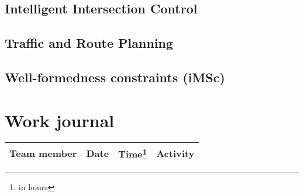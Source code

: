 \documentclass[a4paper]{article}
\begin{document}
\subsection{Intelligent Intersection Control}


\subsection{Traffic and Route Planning}


\subsection{Well-formedness constraints (iMSc)}



\section{Work journal}

\begin{tabularx}{\textwidth}{l l l X}
	\toprule
	Team member & Date & Time\footnote{in hours} & Activity \\ \midrule
	\bottomrule
\end{tabularx}

\clearpage
\printglossaries
\end{document}
